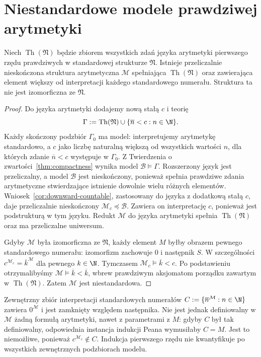 \section{Niestandardowe modele prawdziwej arytmetyki}
\begin{twierdzenie}
\label{thm:ls-true-arithmetic-nonstandard}
Niech $\operatorname{Th}(\mathfrak N)$
będzie zbiorem wszystkich zdań języka
arytmetyki pierwszego rzędu prawdziwych
w standardowej strukturze $\mathfrak N$.
Istnieje przeliczalnie nieskończona
struktura arytmetyczna $\mathcal M$
spełniająca $\operatorname{Th}(\mathfrak N)$
oraz zawierająca element większy
od interpretacji każdego standardowego
numerału. Struktura ta nie jest
izomorficzna ze $\mathfrak N$.
\end{twierdzenie}
\begin{proof}
Do języka arytmetyki dodajemy nową
stałą $c$ i teorię
\[
\Gamma:=
\operatorname{Th}(\mathfrak N)
\cup\{\overline n<c:n\in\N\}.
\]
Każdy skończony podzbiór $\Gamma_0$
ma model: interpretujemy arytmetykę
standardowo, a $c$ jako liczbę naturalną
większą od wszystkich wartości $n$,
dla których zdanie $\overline n<c$
występuje w $\Gamma_0$.
Z Twierdzenia o zwartości~\ref{thm:compactness}
wynika model $\mathcal B\models\Gamma$.
Rozszerzony język jest przeliczalny,
a model $\mathcal B$ jest nieskończony,
ponieważ spełnia prawdziwe zdania
arytmetyczne stwierdzające istnienie
dowolnie wielu różnych elementów.
Wniosek~\ref{cor:downward-countable},
zastosowany do języka z dodatkową
stałą $c$, daje przeliczalnie nieskończony
$\mathcal M_c\preccurlyeq\mathcal B$.
Zawiera on interpretację $c$,
ponieważ jest podstrukturą w tym języku.
Redukt $\mathcal M$ do języka arytmetyki
spełnia $\operatorname{Th}(\mathfrak N)$
oraz ma przeliczalne uniwersum.

Gdyby $\mathcal M$ była izomorficzna
ze $\mathfrak N$, każdy element $M$
byłby obrazem pewnego standardowego
numerału: izomorfizm zachowuje $0$
i następnik $S$. W szczególności
$c^{\mathcal M_c}=\overline k^{\mathcal M}$
dla pewnego $k\in\N$. Tymczasem
$\mathcal M_c\models\overline k<c$.
Po podstawieniu otrzymalibyśmy
$\mathcal M\models\overline k<\overline k$,
wbrew prawdziwym aksjomatom
porządku zawartym w
$\operatorname{Th}(\mathfrak N)$.
Zatem $\mathcal M$ jest niestandardowa.
\end{proof}

\begin{uwaga}
\label{rem:ls-nonstandard-cut}
Zewnętrzny zbiór interpretacji
standardowych numerałów
$C:=\{\overline n^{\mathcal M}:n\in\N\}$
zawiera $0^{\mathcal M}$ i jest
zamknięty względem następnika.
Nie jest jednak definiowalny
w $\mathcal M$ żadną formułą
arytmetyki, nawet z parametrami
z $M$: gdyby $C$ był tak
definiowalny, odpowiednia instancja
indukcji Peana wymusiłaby $C=M$.
Jest to niemożliwe, ponieważ
$c^{\mathcal M_c}\notin C$.
Indukcja pierwszego rzędu nie
kwantyfikuje po wszystkich
zewnętrznych podzbiorach modelu.
\end{uwaga}

